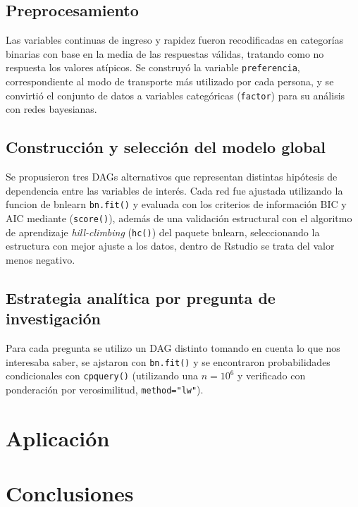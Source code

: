 \documentclass[
  letterpaper,
  DIV=11,
  numbers=noendperiod]{scrartcl}
\begin{document}
\subsection{Preprocesamiento}
Las variables continuas de ingreso y rapidez fueron recodificadas en categorías binarias con base en la media de las respuestas válidas, tratando como no respuesta los valores atípicos. Se construyó la variable \texttt{preferencia}, correspondiente al modo de transporte más utilizado por cada persona, y se convirtió el conjunto de datos a variables categóricas (\texttt{factor}) para su análisis con redes bayesianas.

\subsection{Construcción y selección del modelo global}
Se propusieron tres DAGs alternativos que representan distintas hipótesis de dependencia entre las variables de interés. Cada red fue ajustada utilizando la funcion de bnlearn \texttt{bn.fit()} y evaluada con los criterios de información BIC y AIC mediante (\texttt{score()}), además de una validación estructural con el algoritmo de aprendizaje \textit{hill-climbing} (\texttt{hc()}) del paquete bnlearn, seleccionando la estructura con mejor ajuste
a los datos, dentro de Rstudio se trata del valor menos negativo.

\subsection{Estrategia analítica por pregunta de investigación}
Para cada pregunta se utilizo un DAG distinto tomando en cuenta lo que nos interesaba saber, se ajstaron con \texttt{bn.fit()} y se encontraron probabilidades condicionales con \texttt{cpquery()} (utilizando una \(n=10^{6}\) y verificado con ponderación por
verosimilitud, \texttt{method="lw"}).

\section{Aplicación}\label{Aplicación}

\section{Conclusiones}\label{Conclusiones}


\end{document}
